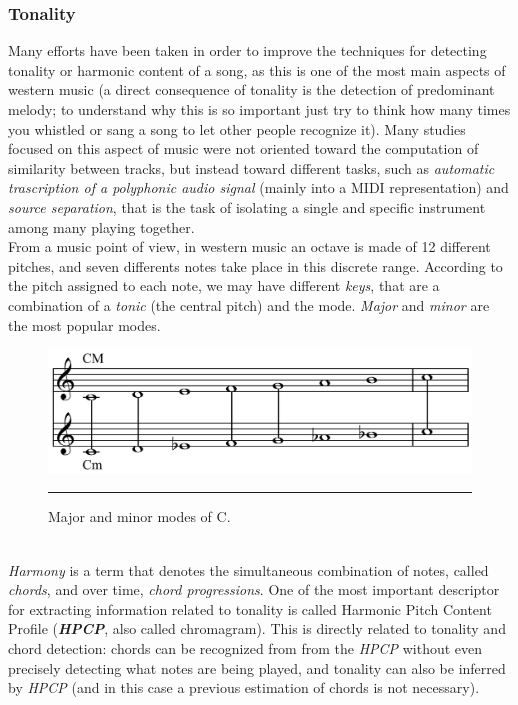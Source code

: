 \subsubsection{Tonality}
Many efforts have been taken in order to improve the techniques for detecting tonality or harmonic content of a song, as this is one of the most main aspects of western music (a direct consequence of tonality is the detection of predominant melody; to understand why this is so important just try to think how many times you whistled or sang a song to let other people recognize it). Many studies focused on this aspect of music were not oriented toward the computation of similarity between tracks, but instead toward different tasks, such as \textit{automatic trascription of a polyphonic audio signal} (mainly into a MIDI representation) and \textit{source separation}, that is the task of isolating a single and specific instrument among many playing together. \\
From a music point of view, in western music an octave is made of 12 different pitches, and seven differents notes take place in this discrete range. According to the pitch assigned to each note, we may have different \textit{keys}, that are a combination of a \textit{tonic} (the central pitch) and the mode. \textit{Major} and \textit{minor} are the most popular modes. 
\begin{figure}[h]
\begin{center}
\includegraphics[scale=0.15]{Figures/majorminor.png}
    \rule{20em}{0.5pt}
  \caption[Major and minor modes]{Major and minor modes of C.}
  \label{fig:GStreamer}
\end{center}
\end{figure} \\
\textit{Harmony} is a term that denotes the simultaneous combination of notes, called \textit{chords}, and over time, \textit{chord progressions}.  One of the most important descriptor for extracting information related to tonality is called Harmonic Pitch Content Profile (\textbf{\textit{HPCP}}, also called chromagram). This is directly related to tonality and chord detection: chords can be recognized from from the \textit{HPCP} without even precisely detecting what notes are being played, and tonality can also be inferred by \textit{HPCP} (and in this case a previous estimation of chords is not necessary). \\
